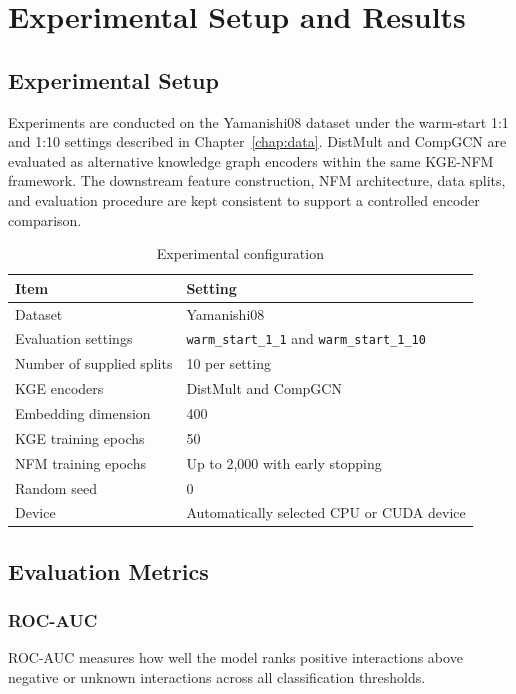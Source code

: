 \chapter{Experimental Setup and Results}
\label{chap:experiments}

\section{Experimental Setup}

Experiments are conducted on the Yamanishi08 dataset under the warm-start 1:1
and 1:10 settings described in Chapter~\ref{chap:data}. DistMult and CompGCN
are evaluated as alternative knowledge graph encoders within the same KGE-NFM
framework. The downstream feature construction, NFM architecture, data splits,
and evaluation procedure are kept consistent to support a controlled encoder
comparison.

\begin{table}[H]
\centering
\caption{Experimental configuration}
\label{tab:experiment_setup}
\begin{tabularx}{\textwidth}{lX}
\toprule
\textbf{Item} & \textbf{Setting} \\
\midrule
Dataset & Yamanishi08 \\
Evaluation settings & \texttt{warm\_start\_1\_1} and \texttt{warm\_start\_1\_10} \\
Number of supplied splits & 10 per setting \\
KGE encoders & DistMult and CompGCN \\
Embedding dimension & 400 \\
KGE training epochs & 50 \\
NFM training epochs & Up to 2,000 with early stopping \\
Random seed & 0 \\
Device & Automatically selected CPU or CUDA device \\
\bottomrule
\end{tabularx}
\end{table}

\section{Evaluation Metrics}

\subsection{ROC-AUC}

ROC-AUC measures how well the model ranks positive interactions above negative
or unknown interactions across all classification thresholds.

